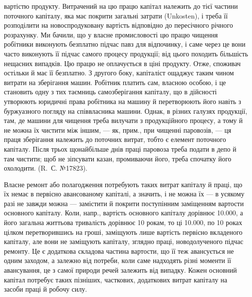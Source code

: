 \parcont{}  %
вартістю продукту. Витрачений на цю працю капітал належить до тієї частини поточного капіталу, яка
має покрити загальні затрати (Unkosten), і треба її розподілити на новоспродуковану вартість
відповідно до пересічного річного розрахунку. Ми бачили, що у власне промисловості цю працю чищення
робітники виконують безплатно підчас павз для відпочинку, і саме через це вони часто виконують її
підчас самого процесу продукції; від цього походить більшість нещасних випадків. Цю працю
не оплачується в ціні продукту. Отже, споживач остільки й має її безплатно. З другого боку,
капіталіст ощаджує таким чином витрати на зберігання машин. Робітник платить сам, власною особою, і
це становить одну з тих таємниць самозберігання капіталу, що в дійсності утворюють юридичні права
робітника на машину й перетворюють його навіть з буржуазного погляду на співвласника машини. Однак,
в різних галузях продукції, там, де машини для чищення треба вилучати з продукційного процесу, а
тому й не можна їх чистити між іншим, — як, прим., при чищенні паровозів, — ця праця зберігання
належить до поточних витрат, тобто є елемент поточного капіталу. Після трьох щонайбільше днів праці
паровоза треба подати в депо й там чистити; щоб не зіпсувати казан, промиваючи його, треба спочатку
його охолодити. (R.~С. №\num{17823}).

Власне ремонт або полагодження потребують таких витрат капіталу й праці, що їх немає в первісно
авансованому капіталі, а значить, і не можна їх — в усякому разі не завжди можна — замістити й
покрити поступінним заміщенням вартости основного капіталу. Коли, напр., вартість основного капіталу
дорівнює \num{10.000}, а його загальна життьова тривалість дорівнює 10 рокам, то ці \num{10.000}, по 10 роках цілком перетворившись на гроші, заміщують лише вартість первісно вкладеного
капіталу, але вони не заміщують капіталу, зглядно праці, новодолученого підчас ремонту. Це є
додаткова складова частина вартости, що її теж авансується не одним заходом, а залежно від потреби,
коли саме надходять різні моменти її авансування, це з самої природи речей залежить від випадку.
Кожен основний капітал потребує таких пізніших,
часткових, додаткових витрат капіталу на засоби праці й робочу силу.

